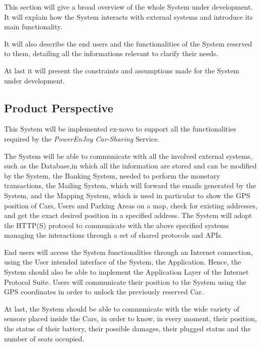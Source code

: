 This section will give a broad overview of the whole System under development. It will explain how the System interacts with external systems and introduce its main functionality.

It will also describe the end users and the functionalities of the System reserved to them, detailing all the informations relevant to clarify their needs.

At last it will present the constraints and assumptions made for the System under development.

\subsection{Product Perspective}

This System will be implemented ex-novo to support all the functionalities required by the \textit{PowerEnJoy Car-Sharing} Service.

The System will be able to communicate with all the involved external systems, such as the Database,in which all the information are stored and can be modified by the System, the Banking System, needed to perform the monetary transactions, the Mailing System, which will forward the emails generated by the System, and the Mapping System, which is used in particular to show the GPS position of Cars, Users and Parking Areas on a map, check for existing addresses, and get the exact desired position in a specified address. The System will adopt the HTTP(S) protocol to communicate with the above specified systems managing the interactions through a set of shared protocols and APIs.
\smallskip

End users will access the System functionalities through an Internet connection, using the User intended interface of the System, the Application. Hence, the System should also be able to implement the Application Layer of the Internet Protocol Suite.
Users will communicate their position to the System using the GPS coordinates in order to unlock the previously reserved Car.
\smallskip

At last, the System should be able to communicate with the wide variety of sensors placed inside the Cars, in order to know, in every moment, their position, the status of their battery, their possible damages, their plugged status and the number of seats occupied. 

